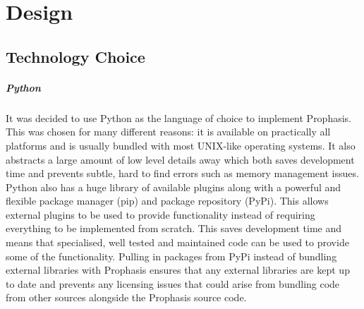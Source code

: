 \documentclass[bsc,logo,twoside]{infthesis}
\begin{document}
\chapter{Design}
\section{Technology Choice}
\paragraph*{Python}
	It was decided to use Python as the language of choice to implement Prophasis.
	This was chosen for many different reasons: it is available on practically all
	platforms and is usually bundled with most UNIX-like operating systems.  It
	also abstracts a large amount of low level details away which both saves
	development time and prevents subtle, hard to find errors such as memory
	management issues.  Python also has a huge library of available plugins along
	with a powerful and flexible package manager (pip) and package repository
	(PyPi).  This allows external plugins to be used to provide functionality
	instead of requiring everything to be implemented from scratch.  This saves
	development time and means that specialised, well tested and maintained code
	can be used to provide some of the functionality.  Pulling in packages from
	PyPi instead of bundling external libraries with Prophasis ensures that any
	external libraries are kept up to date and prevents any licensing issues that
	could arise from bundling code from other sources alongside the Prophasis
	source code.
	
\end{document}
